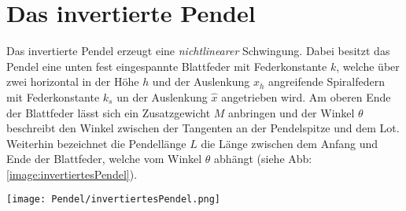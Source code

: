 

\section{Das invertierte Pendel}
\label{sec:invertPendel}
Das invertierte Pendel erzeugt eine \textit{nichtlinearer} Schwingung. Dabei besitzt das Pendel eine unten fest eingespannte Blattfeder mit Federkonstante $k$, welche über zwei horizontal in der Höhe $h$ und der Auslenkung $x_h$ angreifende Spiralfedern mit Federkonstante $k_s$ un der Auslenkung $\hat{x}$ angetrieben wird. Am oberen Ende der Blattfeder lässt sich ein Zusatzgewicht $M$ anbringen und der Winkel $\theta$ beschreibt den Winkel zwischen der Tangenten an der Pendelspitze und dem Lot. Weiterhin bezeichnet die Pendellänge $L$ die Länge zwischen dem Anfang und Ende der Blattfeder, welche vom Winkel $\theta$ abhängt (siehe Abb: \ref{image:invertiertesPendel}).
\begin{center}
    \texttt{[image: Pendel/invertiertesPendel.png]}
    \label{image:invertiertesPendel}
\end{center}
